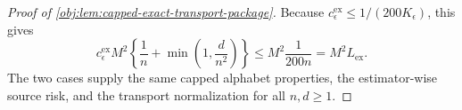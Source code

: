 \begin{proof}[Proof of \cref{obj:lem:capped-exact-transport-package}]
Because \(c_{\epsilon}^{\mathrm{ex}}\le 1/(200K_\epsilon)\), this gives
\[
c_{\epsilon}^{\mathrm{ex}}M^2
\left\{\frac1n+\min\left(1,\frac d{n^2}\right)\right\}
\le
M^2\frac1{200n}
=
M^2L_{\mathrm{ex}} .
\]
The two cases supply the same capped alphabet properties, the estimator-wise source risk, and the transport normalization for all \(n,d\ge1\). %
\end{proof}
